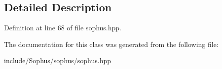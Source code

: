 \subsection{Detailed Description}


Definition at line 68 of file sophus.\+hpp.



The documentation for this class was generated from the following file\+:\begin{DoxyCompactItemize}
\item 
include/\+Sophus/sophus/sophus.\+hpp\end{DoxyCompactItemize}
